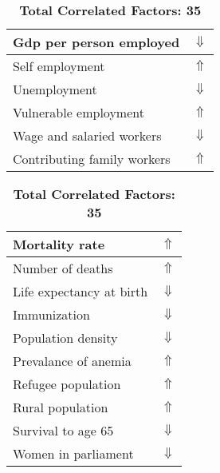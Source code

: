 \documentclass[12pt,notitlepage,oneside]{report}
\begin{document}
\begin{table}[!htb]
\begin{tabular}{|l|l|}
Gdp per person employed & $\Downarrow$\\ \hline
Self employment & $\Uparrow$\\ \hline
Unemployment & $\Downarrow$\\ \hline
Vulnerable employment & $\Uparrow$\\ \hline
Wage and salaried workers & $\Downarrow$\\ \hline
Contributing family workers & $\Uparrow$\\ \hline
\end{tabular}
\begin{tabular}{|l|l|}
\hline
Mortality rate & $\Uparrow$\\ \hline
Number of deaths & $\Uparrow$\\ \hline
Life expectancy at birth & $\Downarrow$\\ \hline
Immunization & $\Downarrow$\\ \hline
Population density & $\Downarrow$\\ \hline
Prevalance of anemia & $\Uparrow$\\ \hline
Refugee population & $\Uparrow$\\ \hline
Rural population & $\Uparrow$\\ \hline
Survival to age 65 & $\Downarrow$\\ \hline
Women in parliament & $\Downarrow$\\ \hline
\end{tabular}
\caption*{\textbf{Total Correlated Factors: 35}}
\end{table}
\clearpage
\end{document}

